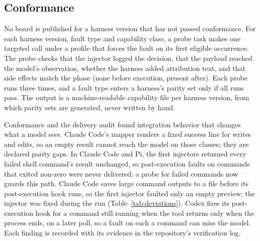 \subsection{Conformance}
\label{sec:conformance}

No board is published for a harness version that has not passed conformance.
For each harness version, fault type and capability class, a probe task makes one targeted call under a profile that forces the fault on its first eligible occurrence.
The probe checks that the injector logged the decision, that the payload reached the model's observation, whether the harness added attribution text, and that side effects match the phase (none before execution, present after).
Each probe runs three times, and a fault type enters a harness's parity set only if all runs pass.
The output is a machine-readable capability file per harness version, from which parity sets are generated, never written by hand.

Conformance and the delivery audit found integration behavior that changes what a model sees.
Claude Code's mapper renders a fixed success line for writes and edits, so an empty result cannot reach the model on those classes; they are declared parity gaps.
In Claude Code and Pi, the first injectors returned every failed shell command's result unchanged, so post-execution faults on commands that exited non-zero were never delivered; a probe for failed commands now guards this path.
Claude Code saves large command outputs to a file before its post-execution hook runs, so the first injector faulted only an empty preview; the injector was fixed during the run (Table~\ref{tab:deviations}).
Codex fires its post-execution hook for a command still running when the tool returns only when the process ends, on a later poll, so a fault on such a command can miss the model.
Each finding is recorded with its evidence in the repository's verification log.
